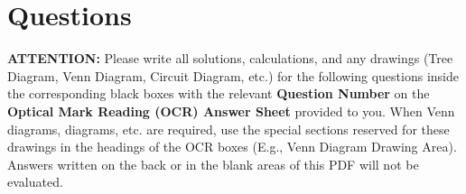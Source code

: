 \documentclass[12pt,a4paper]{article}
\begin{document}
\newpage

\section*{\textbf{\color{TitleColor}Questions}}

\noindent\colorbox{yellow!40}{%
    \parbox{\dimexpr\linewidth-2\fboxsep\relax}{%
        \textbf{ATTENTION:} Please write all solutions, calculations, and any drawings (Tree Diagram, Venn Diagram, Circuit Diagram, etc.) for the following questions inside the corresponding black boxes with the relevant \textbf{Question Number} on the \textbf{Optical Mark Reading (OCR) Answer Sheet} provided to you. When Venn diagrams, diagrams, etc. are required, use the special sections reserved for these drawings in the headings of the OCR boxes ({\color{ChoiceColor}E.g., Venn Diagram Drawing Area}). Answers written on the back or in the blank areas of this PDF will not be evaluated.
    }%
}
\vspace{0.5cm}
\end{document}
